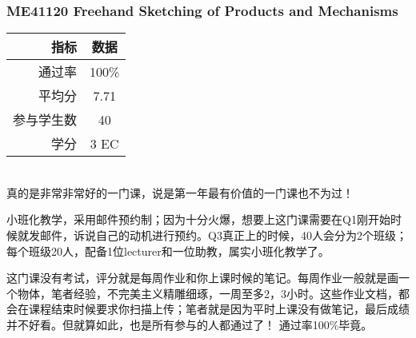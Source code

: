 \subsubsection{ME41120 Freehand Sketching of Products and Mechanisms}
\begin{minipage}{0.45\textwidth}
\centering
{}
\end{minipage}%
\begin{minipage}{0.45\textwidth}
\raggedleft
\begin{tabular}{r|c}
\textbf{指标} & \textbf{数据} \\ \hline
通过率 & 100\% \\ 
平均分 & 7.71 \\ 
参与学生数 & 40 \\
学分 & 3 EC\\
\end{tabular}
\end{minipage}\\

真的是非常非常好的一门课，说是第一年最有价值的一门课也不为过！

小班化教学，采用邮件预约制；因为十分火爆，想要上这门课需要在Q1刚开始时候就发邮件，诉说自己的动机进行预约。Q3真正上的时候，40人会分为2个班级；每个班级20人，配备1位lecturer和一位助教，属实小班化教学了。

这门课没有考试，评分就是每周作业和你上课时候的笔记。每周作业一般就是画一个物体，笔者经验，不完美主义精雕细琢，一周至多2，3小时。这些作业文档，都会在课程结束时候要求你扫描上传；笔者就是因为平时上课没有做笔记，最后成绩并不好看。但就算如此，也是所有参与的人都通过了！ 通过率100\%毕竟。

